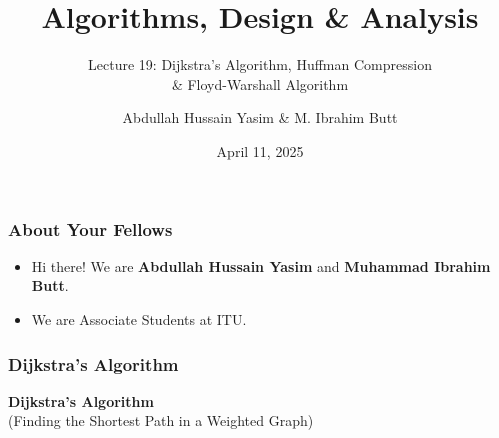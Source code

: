 \documentclass[10pt,aspectratio=43]{beamer}
\title{Algorithms, Design \& Analysis}
\subtitle{Lecture 19: Dijkstra's Algorithm, Huffman Compression \\ \& Floyd-Warshall Algorithm}
\author[BSCS23008 \& BSCS23086]{Abdullah Hussain Yasim \& M. Ibrahim Butt}
\institute[ITU]{Information Technology University}
\date{April 11, 2025}
\begin{document}
\begin{frame}
    \titlepage
\end{frame}


\begin{frame}
    \frametitle{About Your Fellows}
    \begin{itemize}
        \item Hi there! We are \textbf{Abdullah Hussain Yasim} and \textbf{Muhammad Ibrahim Butt}.
        \item We are Associate Students at ITU.
    \end{itemize}
    
\end{frame}


\begin{frame}
    \frametitle{\textcolor{myMaroon}{Dijkstra’s Algorithm}}
    \begin{center}
        {\Large \textbf{\textcolor{myMaroon}{Dijkstra’s Algorithm}}} \\
        \vspace{0.3cm}
        {\large \textcolor{myBlue}{(Finding the Shortest Path in a Weighted Graph)}}
    \end{center}

\end{frame}
\end{document}

